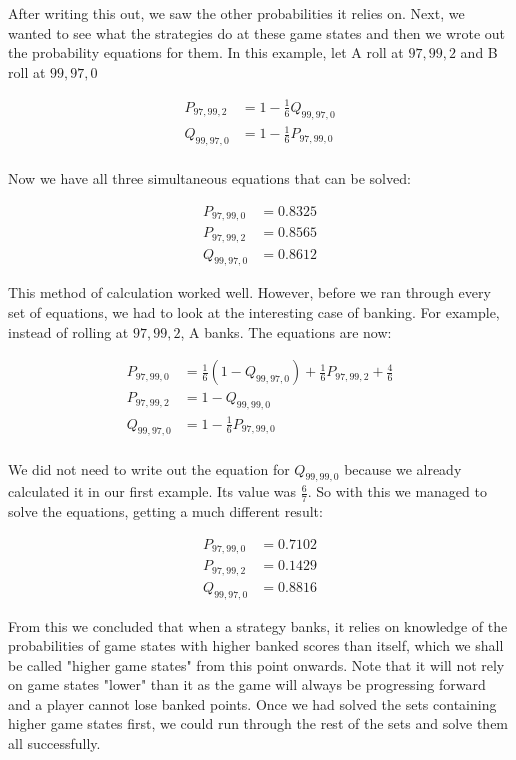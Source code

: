 \documentclass[a4paper,titlepage]{article}
\begin{document}
After writing this out, we saw the other probabilities it relies on. Next, we wanted to see what the strategies do at these game states and then we wrote out the probability equations for them. In this example, let A roll at $97,99,2$ and B roll at $99,97,0$

\begin{align*}
	P_{97,99,2} &= 1 - \frac{1}{6}Q_{99,97,0}\\
	Q_{99,97,0} &= 1 - \frac{1}{6}P_{97,99,0}\\
\end{align*}

Now we have all three simultaneous equations that can be solved:

\begin{align*}
	P_{97,99,0} &= 0.8325\\
	P_{97,99,2} &= 0.8565\\
	Q_{99,97,0} &= 0.8612
\end{align*}

This method of calculation worked well. However, before we ran through every set of equations, we had to look at the interesting case of banking. For example, instead of rolling at $97,99,2$, A banks. The equations are now:

\begin{align*}
	P_{97,99,0} &= \frac{1}{6}(1 - Q_{99,97,0})+\frac{1}{6}P_{97,99,2}+\frac{4}{6}\\
	P_{97,99,2} &= 1 - Q_{99,99,0}\\
	Q_{99,97,0} &= 1 - \frac{1}{6}P_{97,99,0}\\
\end{align*}

We did not need to write out the equation for $Q_{99,99,0}$ because we already calculated it in our first example. Its value was $\frac{6}{7}$. So with this we managed to solve the equations, getting a much different result:

\begin{align*}
	P_{97,99,0} &= 0.7102\\
	P_{97,99,2} &= 0.1429\\
	Q_{99,97,0} &= 0.8816
\end{align*}

From this we concluded that when a strategy banks, it relies on knowledge of the probabilities of game states with higher banked scores than itself, which we shall be called "higher game states" from this point onwards. Note that it will not rely on game states "lower" than it as the game will always be progressing forward and a player cannot lose banked points. Once we had solved the sets containing higher game states first, we could run through the rest of the sets and solve them all successfully.
\end{document}
